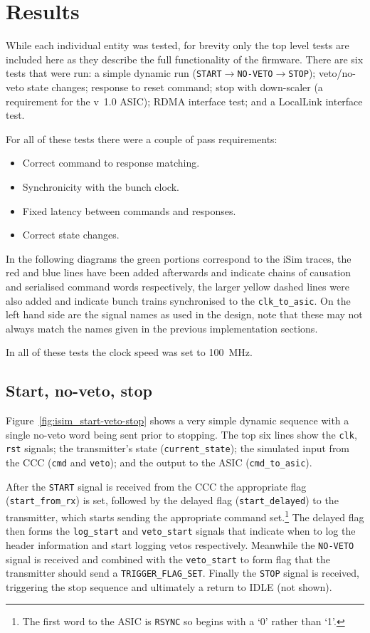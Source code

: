 \section{Results} %
\label{sec:results}
While each individual entity was tested, for brevity only the top level tests are included here as they describe the full functionality of the firmware. There are six tests that were run: a simple dynamic run (\texttt{START}\(\rightarrow\)\texttt{NO-VETO}\(\rightarrow\)\texttt{STOP}); veto/no-veto state changes; response to reset command; stop with down-scaler (a requirement for the v~1.0 ASIC); RDMA interface test; and a LocalLink interface test.

For all of these tests there were a couple of pass requirements:
\begin{itemize}
  \item Correct command to response matching.
  \item Synchronicity with the bunch clock.
  \item Fixed latency between commands and responses. 
  \item Correct state changes.
\end{itemize}

In the following diagrams the green portions correspond to the iSim traces, the red and blue lines have been added afterwards and indicate chains of causation and serialised command words respectively, the larger yellow dashed lines were also added and indicate bunch trains synchronised to the \texttt{clk\_to\_asic}. On the left hand side are the signal names as used in the design, note that these may not always match the names given in the previous implementation sections.

In all of these tests the clock speed was set to 100~MHz.

\subsection{Start, no-veto, stop} %
\label{sec:start_no_veto_stop}
Figure~\ref{fig:isim_start-veto-stop} shows a very simple dynamic sequence with a single no-veto word being sent prior to stopping. The top six lines show the \texttt{clk}, \texttt{rst} signals; the transmitter's state (\texttt{current\_state}); the simulated input from the CCC (\texttt{cmd} and \texttt{veto}); and the output to the ASIC (\texttt{cmd\_to\_asic}).

After the \texttt{START} signal is received from the CCC the appropriate flag (\texttt{start\_from\_rx}) is set, followed by the delayed flag (\texttt{start\_delayed}) to the transmitter, which starts sending the appropriate command set.\footnote{The first word to the ASIC is \texttt{RSYNC} so begins with a `0' rather than `1'.} The delayed flag then forms the \texttt{log\_start} and \texttt{veto\_start} signals that indicate when to log the header information and start logging vetos respectively. Meanwhile the \texttt{NO-VETO} signal is received and combined with the \texttt{veto\_start} to form flag that the transmitter should send a \texttt{TRIGGER\_FLAG\_SET}. Finally the \texttt{STOP} signal is received, triggering the stop sequence and ultimately a return to IDLE (not shown).

